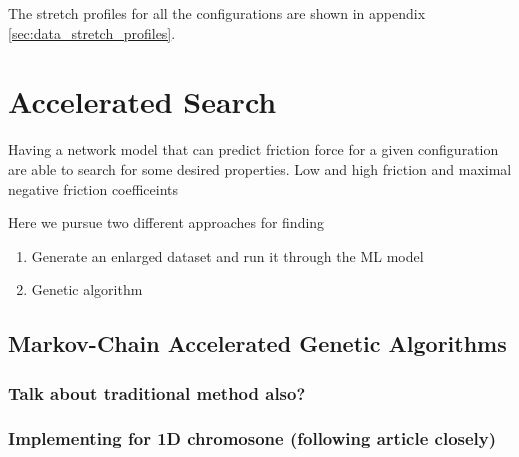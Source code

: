 The stretch profiles for all the configurations are shown in appendix \ref{sec:data_stretch_profiles}.



 
\chapter{Accelerated Search}

Having a network model that can predict friction force for a given configuration are able to search for some desired properties. Low and high friction and maximal negative friction coefficeints


Here we pursue two different approaches for finding 
\begin{enumerate}
  \item Generate an enlarged dataset and run it through the ML model 
  \item Genetic algorithm
\end{enumerate}


\section{Markov-Chain Accelerated Genetic Algorithms}

\subsection{Talk about traditional method also?}

\subsection{Implementing for 1D chromosone (following article closely)}

